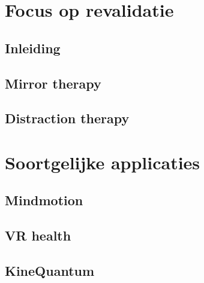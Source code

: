 \section{Focus op revalidatie}
\subsection{Inleiding}
\subsection{Mirror therapy}
\subsection{Distraction therapy}

\section{Soortgelijke applicaties}
\subsection{Mindmotion}
\subsection{VR health}
\subsection{KineQuantum}

